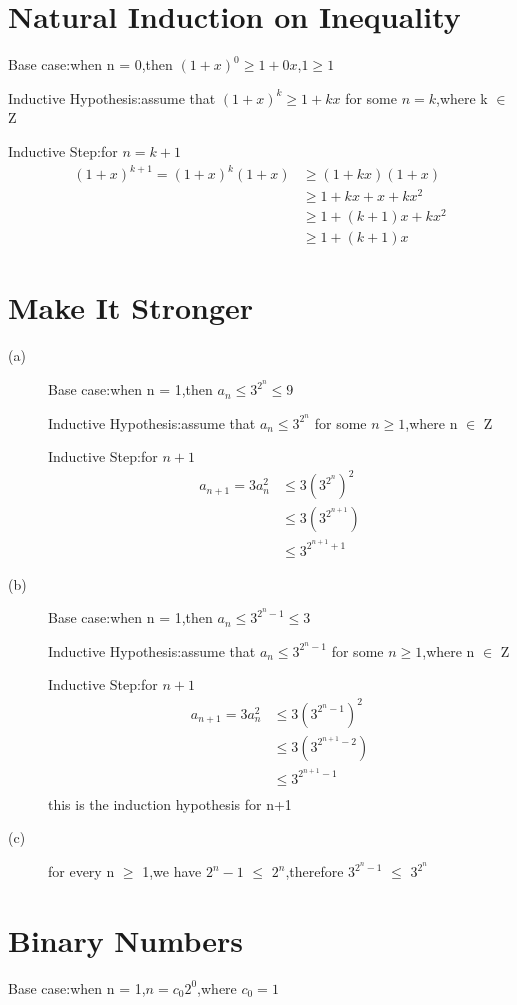 \documentclass{article}
\begin{document}
	\section{Natural Induction on Inequality}
	Base case:when n = 0,then $(1 + x)^0 \geq 1 + 0x$,$1 \geq 1$
	
	Inductive Hypothesis:assume that $(1 + x)^k \geq 1 + kx$ for some $n = k$,where k $\in$ Z
	
	Inductive Step:for $n = k + 1$
	\begin{align*}
		(1+x)^{k+1} = (1+x)^k (1+x) &\geq (1+kx)(1+x) \\
		&\geq 1 + kx + x + kx^2 \\
		&\geq 1 + (k+1)x + kx^2 \\
		&\geq 1 + (k+1)x
	\end{align*}
	\section{Make It Stronger}
	\begin{description}
		\item[(a)]
		Base case:when n = 1,then $a_n \leq 3^{2^n} \leq 9$
		
		Inductive Hypothesis:assume that $a_n \leq 3^{2^n}$ for some $n \geq 1$,where n $\in$ Z
		
		Inductive Step:for $n + 1$
		\begin{align*}
			a_{n+1} = 3a_n^2 &\leq 3(3^{2^n})^2 \\
			&\leq3(3^{2^{n+1}}) \\
			&\leq3^{2^{n+1} + 1}
		\end{align*}
		\item[(b)]
		Base case:when n = 1,then $a_n \leq 3^{2^n - 1} \leq 3$
		
		Inductive Hypothesis:assume that $a_n \leq 3^{2^n - 1}$ for some $n \geq 1$,where n $\in$ Z
		
		Inductive Step:for $n + 1$
		\begin{align*}
			a_{n+1} = 3a_n^2 &\leq 3(3^{2^n - 1})^2 \\
			&\leq3(3^{2^{n+1} - 2}) \\
			&\leq3^{2^{n+1} - 1} \\
		\end{align*}
		this is the induction hypothesis for n+1
		\item[(c)]
		for every n $\geq$ 1,we have $2^n - 1$ $\leq$ $2^n$,therefore $3^{2^n - 1}$ $\leq$ $3^{2^n}$
	\end{description}
	\section{Binary Numbers}
	Base case:when n = 1,$n = c_0 2^0$,where $c_0 = 1$
	
\end{document}

